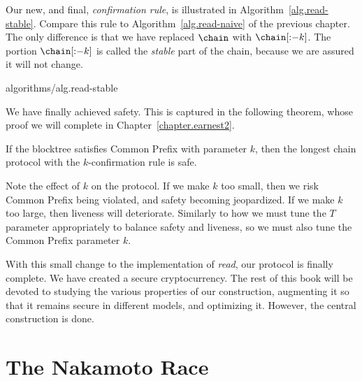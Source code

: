 Our new, and final, \emph{confirmation rule}, is illustrated in
Algorithm~\ref{alg.read-stable}. Compare this rule to Algorithm~\ref{alg.read-naive} of
the previous chapter. The only difference is that we have replaced $\chain$ with $\chain[{:}{-k}]$.
The portion $\chain[{:}{-k}]$ is called the \emph{stable} part of the chain, because we
are assured it will not change.

{algorithms/alg.read-stable}

We have finally achieved safety. This is captured in the following theorem, whose proof we will
complete in Chapter~\ref{chapter.earnest2}.

\begin{theorem}
    If the blocktree satisfies Common Prefix with parameter $k$, then the longest chain protocol
    with the $k$-confirmation rule is safe.
\end{theorem}

Note the effect of $k$ on the protocol. If we make $k$ too small, then we risk Common Prefix
being violated, and safety becoming jeopardized. If we make $k$ too large, then liveness will
deteriorate. Similarly to how we must tune the $T$ parameter appropriately to balance safety
and liveness, so we must also tune the Common Prefix parameter $k$.

With this small change to the implementation of \emph{read}, our protocol is finally complete.
We have created a secure cryptocurrency. The rest of this book will be devoted to studying the
various properties of our construction, augmenting it so that it remains secure in different models,
and optimizing it. However, the central construction is done.

\section{The Nakamoto Race}

